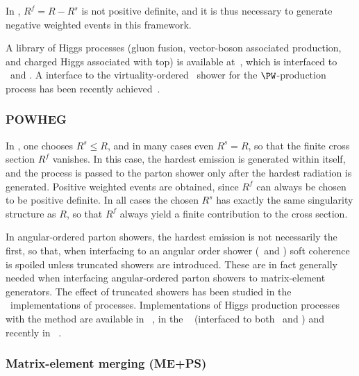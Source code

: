 In \MCatNLO, $R^f=R-R^s$ is not positive definite, and it is thus necessary to
generate negative weighted events in this framework.

A library of \MCatNLO Higgs processes (gluon fusion, vector-boson associated
production, and charged Higgs associated with top) is available
at~, which is interfaced to \herwig\ and \herwigpp.
A \MCatNLO interface to the virtuality-ordered \pythia\
shower for the $\PW$-production process has been recently
achieved~\cite{Torrielli:2010aw}.

\subsubsection{POWHEG}
\label{powheg}

In \POWHEG, one chooses $R^s\le R$, and in many cases even $R^s=R$, so that
the finite cross section $R^f$ vanishes. In this case, the hardest emission is
generated within \POWHEG itself, and the process is passed to the parton shower
only after the hardest radiation is generated.  Positive weighted events are 
obtained, since $R^f$ can always be chosen to be positive definite. In all cases
the chosen $R^s$ has exactly the same singularity structure as $R$,
so that $R^f$ always yield a finite contribution to the cross section.

In angular-ordered parton showers, the hardest emission is not necessarily the
first, so that, when interfacing \POWHEG{} to an angular order shower (\herwig\
and \herwigpp) soft coherence is spoiled unless truncated showers are
introduced. These are in fact generally needed when interfacing angular-ordered
parton showers to matrix-element generators. The effect of truncated showers has
been studied in the \herwigpp\ implementations of \POWHEG{} processes.
Implementations of Higgs production processes with the \POWHEG{} method are 
available in \herwigpp~\cite{Hamilton:2009za}, in the 
\POWHEGBOX~\cite{Alioli:2010xd} (interfaced to both \herwig\ and \pythia) and 
recently in \sherpa~\cite{Hoeche:2010pf}.

\subsubsection{Matrix-element merging (ME+PS)}
\label{meps}

